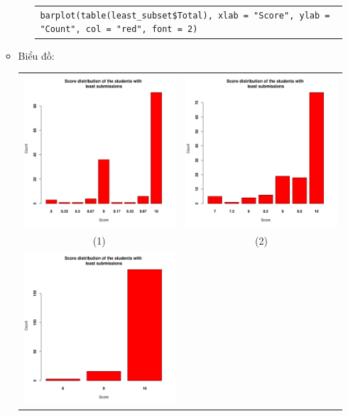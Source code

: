 \documentclass[a4paper]{article}
\theoremstyle{definition}
\begin{document}
\begin{enumerate}[a)]
\begin{itemize}
\begin{itemize}
\begin{center}
\begin{tabular}{p{13cm}}
                    \texttt{barplot(table(least\_subset\$Total), xlab = "Score", ylab = "Count", col = "red", font = 2)}
                \end{tabular}
            \end{center}
        \end{itemize}
        \item Biểu đồ:
        \begin{center}
            \begin{tabular}{c c}
                 \includegraphics[width = 6.9cm]{Images/img3-1-1.jpg} & \includegraphics[width = 6.9cm]{Images/img3-1-2.jpg} \\
                 (1) & (2) \\
                 \includegraphics[width = 6.9cm]{Images/img3-1-3.png} &

\end{tabular}
\end{center}
\end{itemize}
\end{enumerate}
\end{document}

